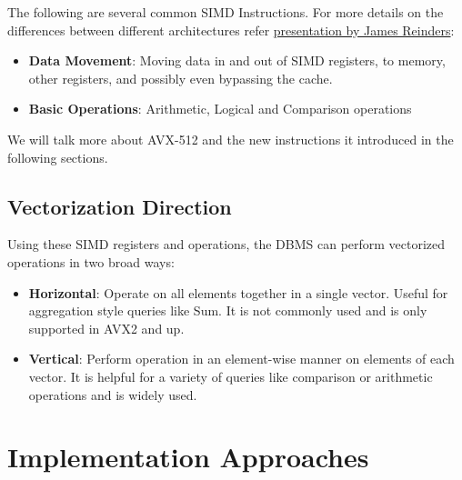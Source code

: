 \documentclass[11pt]{article}
\begin{document}
The following are several common SIMD Instructions. For more details on the differences between different architectures refer \href{https://www.youtube.com/watch?v=_OJmxi4-twY&ab_channel=ArgonneMeetings%2CWebinars%2CandLectures}{ presentation by James Reinders}:
\begin{itemize}
	\item 
	\textbf{Data Movement}: 
	Moving data in and out of SIMD registers, to memory, other registers, and possibly even bypassing the cache.
	
	\item 
	\textbf{Basic Operations}: Arithmetic, Logical and Comparison operations
\end{itemize}

We will talk more about AVX-512 and the new instructions it introduced in the following sections.


\subsection{Vectorization Direction}
Using these SIMD registers and operations, the DBMS can perform vectorized operations in two broad ways:
\begin{itemize}
	\item 
	\textbf{Horizontal}: 
	Operate on all elements together in a single vector. Useful for aggregation style queries like Sum. It is not commonly used and is only supported in AVX2 and up.
	
	\item 
	\textbf{Vertical}: Perform operation in an element-wise manner on elements of each vector. It is helpful for a variety of queries like comparison or arithmetic operations and is widely used.
        
\end{itemize}

\section{Implementation Approaches}
\label{impl}
\end{document}
